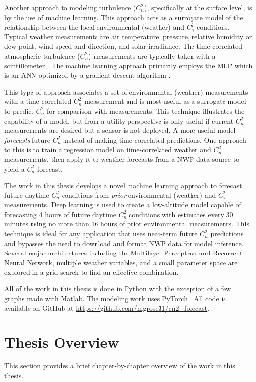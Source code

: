 Another approach to modeling turbulence ($C_{n}^{2}$), specifically at the surface level, is by the use of machine learning. This approach acts as a surrogate model of the relationship between the local environmental (weather) and $C_{n}^{2}$ conditions. Typical weather measurements are air temperature, pressure, relative humidity or dew point, wind speed and direction, and solar irradiance. The time-correlated atmospheric turbulence ($C_{n}^{2}$) measurements are typically taken with a scintillometer \cite{Jellen:20, Su:20, Wang:2014}. The machine learning approach primarily employs the \ac{MLP} which is an \ac{ANN} optimized by a gradient descent algorithm \cite{Su:20, Wang:2014}.

This type of approach associates a set of environmental (weather) measurements with a time-correlated $C_{n}^{2}$ measurement and is most useful as a surrogate model to predict $C_{n}^{2}$ for comparison with measurements. This technique illustrates the capability of a model, but from a utility perspective is only useful if current $C_{n}^{2}$ measurements are desired but a sensor is not deployed. A more useful model \emph{forecasts} future $C_{n}^{2}$ instead of making time-correlated predictions. One approach to this is to train a regression model on time-correlated weather and $C_{n}^{2}$ measurements, then apply it to weather forecasts from a \ac{NWP} data source to yield a $C_{n}^{2}$ forecast.

The work in this thesis develops a novel machine learning approach to forecast future daytime $C_{n}^{2}$ conditions from \emph{prior} environmental (weather) and $C_{n}^{2}$ measurements. Deep learning is used to create a low-altitude model capable of forecasting 4 hours of future daytime $C_{n}^{2}$ conditions with estimates every 30 minutes using no more than 16 hours of prior environmental measurements. This technique is ideal for any application that uses near-term future $C_{n}^{2}$ predictions and bypasses the need to download and format \ac{NWP} data for model inference. Several major architectures including the Multilayer Perceptron and Recurrent Neural Network, multiple weather variables, and a small parameter space are explored in a grid search to find an effective combination.

All of the work in this thesis is done in Python with the exception of a few graphs made with Matlab. The modeling work uses PyTorch \cite{PyTorch}. All code is available on GitHub at \url{https://github.com/mgrose31/cn2_forecast}.

\section{Thesis Overview}
This section provides a brief chapter-by-chapter overview of the work in this thesis.

